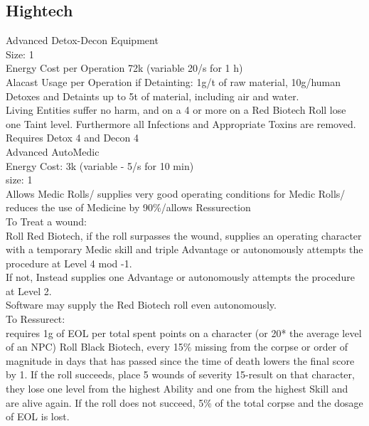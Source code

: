 \documentclass{article}
\begin{document}
    \subsection{Hightech}
    Advanced Detox-Decon Equipment \\
    Size: 1\\
    Energy Cost per Operation 72k (variable 20/s for 1 h)\\
    Alacast Usage per Operation if Detainting: 1g/t of raw material, 10g/human\\
    Detoxes and Detaints up to 5t of material, including air and water.\\
    Living Entities suffer no harm, and on a 4 or more on a Red Biotech Roll lose one Taint level.
    Furthermore all Infections and Appropriate Toxins are removed.\\
    Requires Detox 4 and Decon 4\\
    \newline
    Advanced AutoMedic\\
    Energy Cost: 3k (variable - 5/s for 10 min)\\
    size: 1\\
    Allows Medic Rolls/ supplies very good operating conditions for Medic Rolls/ reduces the use of Medicine by 90\%/allows Ressurection\\
    To Treat a wound:\\
    Roll Red Biotech, if the roll surpasses the wound, supplies an operating character with a temporary Medic skill and
    triple Advantage or autonomously attempts the procedure at Level 4 mod -1.\\
    If not, Instead supplies one Advantage or autonomously attempts the procedure at Level 2.\\
    Software may supply the Red Biotech roll even autonomously.\\
    To Ressurect:\\
    requires 1g of EOL per total spent points on a character (or 20* the average level of an NPC)
    Roll Black Biotech, every 15\% missing from the corpse or order of magnitude in days that has passed since the time of death
    lowers the final score by 1. If the roll succeeds, place 5 wounds of severity 15-result on that character, they lose
    one level from the highest Ability and one from the highest Skill and are alive again. If the roll does not succeed,
    5\% of the total corpse and the dosage of EOL is lost.
    \newline
\end{document}
